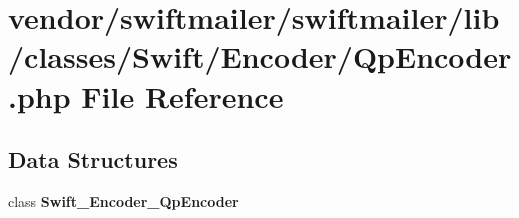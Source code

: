 \section{vendor/swiftmailer/swiftmailer/lib/classes/\+Swift/\+Encoder/\+Qp\+Encoder.php File Reference}
\label{_qp_encoder_8php}
\subsection*{Data Structures}
\begin{DoxyCompactItemize}
\item 
class {\bf Swift\+\_\+\+Encoder\+\_\+\+Qp\+Encoder}
\end{DoxyCompactItemize}
